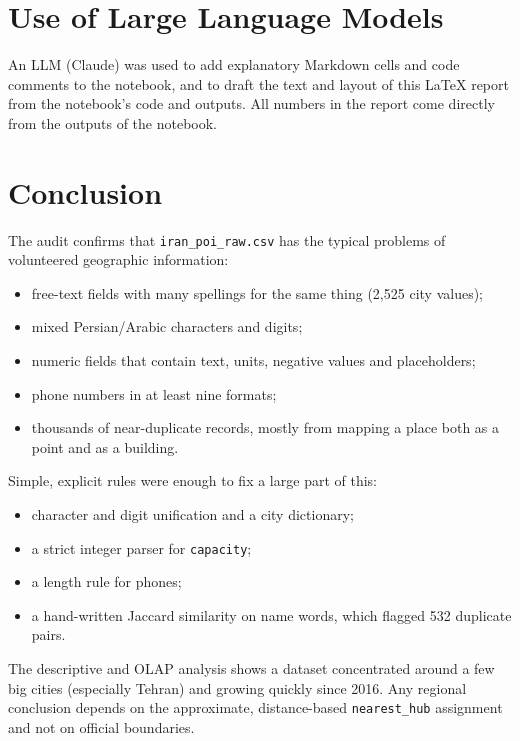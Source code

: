 \documentclass[11pt,a4paper]{article}
\newcommand{\col}[1]{\texttt{#1}}
\begin{document}
\section{Use of Large Language Models}

An LLM (Claude) was used to add explanatory Markdown cells and code
comments to the notebook, and to draft the text and layout of this \LaTeX{} report from the
notebook's code and outputs. All numbers in the report come directly from the
outputs of the notebook.

\section{Conclusion}

The audit confirms that \col{iran\_poi\_raw.csv} has the typical problems of volunteered
geographic information:
\begin{itemize}
  \item free-text fields with many spellings for the same thing (2{,}525 city values);
  \item mixed Persian/Arabic characters and digits;
  \item numeric fields that contain text, units, negative values and placeholders;
  \item phone numbers in at least nine formats;
  \item thousands of near-duplicate records, mostly from mapping a place both as a point and as a building.
\end{itemize}
Simple, explicit rules were enough to fix a large part of this:
\begin{itemize}
  \item character and digit unification and a city dictionary;
  \item a strict integer parser for \col{capacity};
  \item a length rule for phones;
  \item a hand-written Jaccard similarity on name words, which flagged 532 duplicate pairs.
\end{itemize}
The descriptive and OLAP analysis shows a dataset concentrated around a few big cities
(especially Tehran) and growing quickly since 2016. Any regional conclusion depends on the
approximate, distance-based \col{nearest\_hub} assignment and not on official boundaries.
\end{document}
